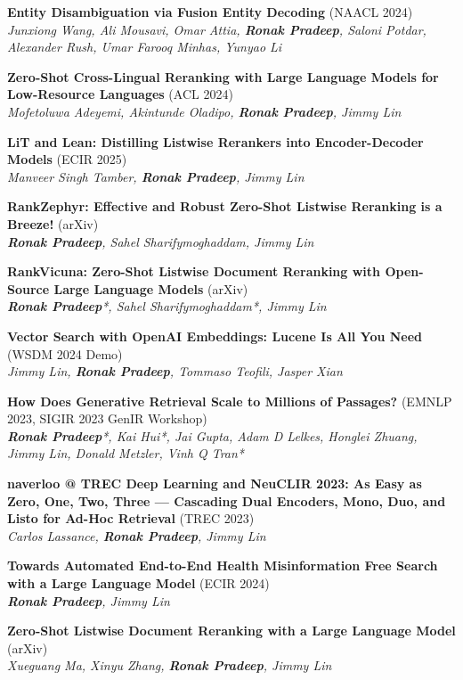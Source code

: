 \documentclass[letterpaper,12pt]{article}
\newcommand{\resumeItem}[0]{
  \item\small{ \vspace{-2pt}
  }
}
\begin{document}
\resumeItem{\textbf{Entity Disambiguation via Fusion Entity Decoding} (NAACL 2024)}\\
\textit{Junxiong Wang, Ali Mousavi, Omar Attia, \textbf{Ronak Pradeep}, Saloni Potdar, Alexander Rush, Umar Farooq Minhas, Yunyao Li}
  \resumeItem{\textbf{Zero-Shot Cross-Lingual Reranking with Large Language Models for Low-Resource Languages} (ACL 2024)}\\
\textit{Mofetoluwa Adeyemi, Akintunde Oladipo, \textbf{Ronak Pradeep}, Jimmy Lin}

\resumeItem{\textbf{LiT and Lean: Distilling Listwise Rerankers into Encoder-Decoder Models} (ECIR 2025)}\\
\textit{Manveer Singh Tamber, \textbf{Ronak Pradeep}, Jimmy Lin}

\resumeItem{\textbf{RankZephyr: Effective and Robust Zero-Shot Listwise Reranking is a Breeze!} (arXiv)}\\
\textit{\textbf{Ronak Pradeep}, Sahel Sharifymoghaddam, Jimmy Lin}

  \resumeItem{\textbf{RankVicuna: Zero-Shot Listwise Document Reranking with Open-Source Large Language Models} (arXiv)}\\
\textit{\textbf{Ronak Pradeep}*, Sahel Sharifymoghaddam*, Jimmy Lin}
\resumeItem{\textbf{Vector Search with OpenAI Embeddings: Lucene Is All You Need} (WSDM 2024 Demo)}\\
    \textit{Jimmy Lin, \textbf{Ronak Pradeep}, Tommaso Teofili, Jasper Xian}\\
  \resumeItem{\textbf{How Does Generative Retrieval Scale to Millions of Passages?} (EMNLP 2023, SIGIR 2023 GenIR Workshop)}\\
\textit{\textbf{Ronak Pradeep}*, Kai Hui*, Jai Gupta, Adam D Lelkes, Honglei Zhuang, Jimmy Lin, Donald Metzler, Vinh Q Tran*}

\resumeItem{\textbf{naverloo @ TREC Deep Learning and NeuCLIR 2023: As Easy as Zero, One, Two, Three --- Cascading Dual Encoders, Mono, Duo, and Listo for Ad-Hoc Retrieval} (TREC 2023)}\\
\textit{Carlos Lassance, \textbf{Ronak Pradeep}, Jimmy Lin}

\resumeItem{\textbf{Towards Automated End-to-End Health Misinformation Free Search with a Large Language Model} (ECIR 2024)}\\
    \textit{\textbf{Ronak Pradeep}, Jimmy Lin}\\
  \resumeItem{\textbf{Zero-Shot Listwise Document Reranking with a Large Language Model} (arXiv)}\\
\textit{Xueguang Ma, Xinyu Zhang, \textbf{Ronak Pradeep}, Jimmy Lin}
\end{document}
